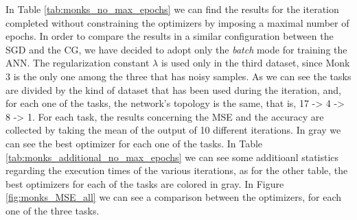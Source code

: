             In Table \ref{tab:monks_no_max_epochs} we can find the results for the iteration completed without
            constraining the optimizers by imposing a maximal number of epochs. In order to compare the
            results in a similar configuration between the SGD and the CG, we have decided to adopt only the
            \textit{batch} mode for training the ANN. The regularization constant $\lambda$ is used only in
            the third dataset, since Monk 3 is the only one among the three that has noisy samples. As we can
            see the tasks are divided by the kind of dataset that has been used during the iteration, and, for
            each one of the tasks, the network's topology is the same, that is, 17 -> 4 -> 8 -> 1. For each
            task, the results concerning the MSE and the accuracy are collected by taking the mean of the
            output of 10 different iterations. In gray we can see the best optimizer for each one of the
            tasks. In Table \ref{tab:monks_additional_no_max_epochs} we can see some additioanl statistics
            regarding the execution times of the various iterations, as for the other table, the best
            optimizers for each of the tasks are colored in gray.
            In Figure \ref{fig:monks_MSE_all} we can see a comparison between the optimizers, for each one of
            the three tasks.

